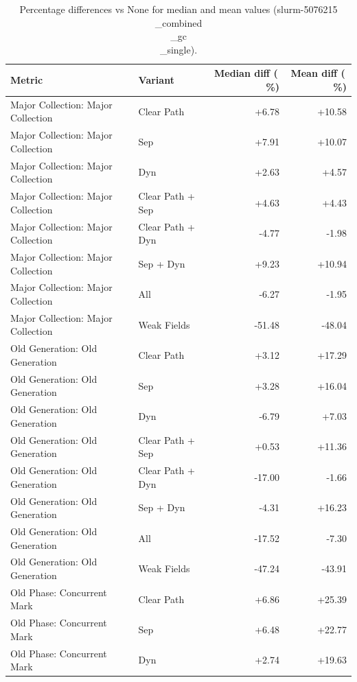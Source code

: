\begin{table}[t]
\centering
\caption{Percentage differences vs None for median and mean values (slurm-5076215\\_combined\\_gc\\_single).}
\label{tab:gc_metric_pct_diff_slurm-5076215\\_combined\\_gc\\_single}
\begin{tabular}{llrr}
\toprule
Metric & Variant & Median diff (\,\%) & Mean diff (\,\%) \\
\midrule
Major Collection: Major Collection & Clear Path & +6.78 & +10.58 \\
Major Collection: Major Collection & Sep & +7.91 & +10.07 \\
Major Collection: Major Collection & Dyn & +2.63 & +4.57 \\
Major Collection: Major Collection & Clear Path + Sep & +4.63 & +4.43 \\
Major Collection: Major Collection & Clear Path + Dyn & -4.77 & -1.98 \\
Major Collection: Major Collection & Sep + Dyn & +9.23 & +10.94 \\
Major Collection: Major Collection & All & -6.27 & -1.95 \\
Major Collection: Major Collection & Weak Fields & -51.48 & -48.04 \\
Old Generation: Old Generation & Clear Path & +3.12 & +17.29 \\
Old Generation: Old Generation & Sep & +3.28 & +16.04 \\
Old Generation: Old Generation & Dyn & -6.79 & +7.03 \\
Old Generation: Old Generation & Clear Path + Sep & +0.53 & +11.36 \\
Old Generation: Old Generation & Clear Path + Dyn & -17.00 & -1.66 \\
Old Generation: Old Generation & Sep + Dyn & -4.31 & +16.23 \\
Old Generation: Old Generation & All & -17.52 & -7.30 \\
Old Generation: Old Generation & Weak Fields & -47.24 & -43.91 \\
Old Phase: Concurrent Mark & Clear Path & +6.86 & +25.39 \\
Old Phase: Concurrent Mark & Sep & +6.48 & +22.77 \\
Old Phase: Concurrent Mark & Dyn & +2.74 & +19.63 \\

\end{tabular}
\end{table}
